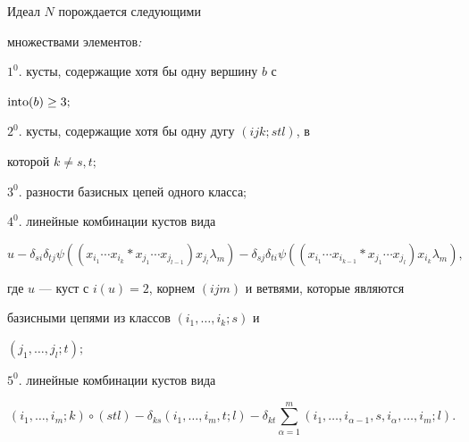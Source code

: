 \begin{thm} Идеал $N$ порождается следующими


множествами элементов{\em :}





$1^0.$ кусты, содержащие хотя бы одну вершину $b$ с


$\operatorname{into} (b)\ge 3;$





$2^0.$ кусты, содержащие хотя бы одну дугу $(ijk;stl)$, в


которой $k\ne s,t;$





$3^0.$ разности базисных цепей одного класса;





$4^0.$ линейные комбинации кустов вида


$$


u-\delta _{si}\delta _{tj}\psi((x_{i_1}\dotsb x_{i_k}


* x_{j_1}\dotsb x_{j_{l-1}})x_{j_l}\lambda _m)-


\delta _{sj}\delta _{ti}\psi((x_{i_1}\dotsb x_{i_{k-1}}


* x_{j_1}\dotsb x_{j_l})x_{i_k}\lambda _m),


$$


где $u$ --- куст с $i(u)=2$, корнем $(ijm)$ и ветвями, которые являются


базисными цепями из классов $(i_1,\dotsc ,i_k;s)$ и


$(j_1,\dotsc ,j_l;t);$





$5^0.$ линейные комбинации кустов вида


$$


(i_1,\dotsc ,i_m;k)\circ (stl)-\delta _{ks}(i_1,\dotsc ,i_m,t;l)-


\delta _{kt}\sum_{\alpha =1}^m


(i_1,\dotsc ,i_{\alpha -1},s,i_{\alpha },\dotsc ,i_m;l).


$$


\end{thm}





